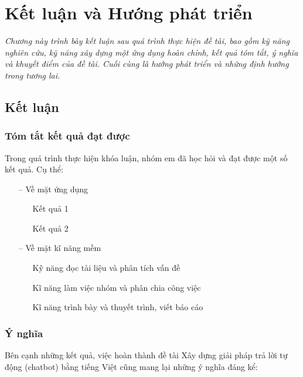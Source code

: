 \chapter{Kết luận và Hướng phát triển}
\label{Chapter5}

\emph{Chương này trình bày kết luận sau quá trình thực hiện đề tài, bao gồm kỹ năng nghiên cứu, kỹ năng xây dựng một ứng dụng hoàn chỉnh, kết quả tóm tắt, ý nghĩa và khuyết điểm của đề tài. Cuối cùng là hướng phát triển và những định hướng trong tương lai.}

\section{Kết luận}
\label{sec:ket-luan}

\subsection{Tóm tắt kết quả đạt được}

Trong quá trình thực hiện khóa luận, nhóm em đã học hỏi và đạt được một số kết quả. Cụ thể:

\begin{itemize}
    \item[--] Về mặt ứng dụng
          \begin{itemize}
              \item[\textbullet] Kết quả 1
              \item[\textbullet] Kết quả 2
          \end{itemize}
    \item[--] Về mặt kĩ năng mềm
          \begin{itemize}
              \item[\textbullet] Kỹ năng đọc tài liệu và phân tích vấn đề
              \item[\textbullet] Kĩ năng làm việc nhóm và phân chia công việc
              \item[\textbullet] Kĩ năng trình bày và thuyết trình, viết báo cáo
          \end{itemize}
\end{itemize}

\subsection{Ý nghĩa}
Bên cạnh những kết quả, việc hoàn thành đề tài Xây dựng giải pháp trả lời tự động (chatbot) bằng tiếng Việt cũng mang lại những ý nghĩa đáng kể:

